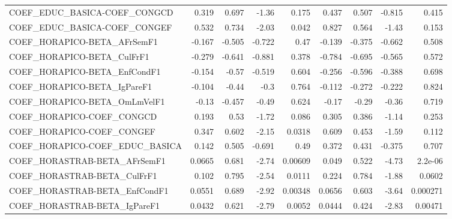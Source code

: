 \begin{tabular}{lrrrrrrrr}
COEF\_EDUC\_BASICA-COEF\_CONGCD          &       0.319 &        0.697 &   -1.36 &    0.175 &      0.437 &       0.507 &       -0.815 &         0.415 \\
COEF\_EDUC\_BASICA-COEF\_CONGEF          &       0.532 &        0.734 &   -2.03 &    0.042 &      0.827 &       0.564 &        -1.43 &         0.153 \\
COEF\_HORAPICO-BETA\_AFrSemF1           &      -0.167 &       -0.505 &  -0.722 &     0.47 &     -0.139 &      -0.375 &       -0.662 &         0.508 \\
COEF\_HORAPICO-BETA\_CulFrF1            &      -0.279 &       -0.641 &  -0.881 &    0.378 &     -0.784 &      -0.695 &       -0.565 &         0.572 \\
COEF\_HORAPICO-BETA\_EnfCondF1          &      -0.154 &        -0.57 &  -0.519 &    0.604 &     -0.256 &      -0.596 &       -0.388 &         0.698 \\
COEF\_HORAPICO-BETA\_IgPareF1           &      -0.104 &        -0.44 &    -0.3 &    0.764 &     -0.112 &      -0.272 &       -0.222 &         0.824 \\
COEF\_HORAPICO-BETA\_OmLmVelF1          &       -0.13 &       -0.457 &   -0.49 &    0.624 &      -0.17 &       -0.29 &        -0.36 &         0.719 \\
COEF\_HORAPICO-COEF\_CONGCD             &       0.193 &         0.53 &   -1.72 &    0.086 &      0.305 &       0.386 &        -1.14 &         0.253 \\
COEF\_HORAPICO-COEF\_CONGEF             &       0.347 &        0.602 &   -2.15 &   0.0318 &      0.609 &       0.453 &        -1.59 &         0.112 \\
COEF\_HORAPICO-COEF\_EDUC\_BASICA        &       0.142 &        0.505 &  -0.691 &     0.49 &      0.372 &       0.431 &       -0.375 &         0.707 \\
COEF\_HORASTRAB-BETA\_AFrSemF1          &      0.0665 &        0.681 &   -2.74 &  0.00609 &      0.049 &       0.522 &        -4.73 &       2.2e-06 \\
COEF\_HORASTRAB-BETA\_CulFrF1           &       0.102 &        0.795 &   -2.54 &   0.0111 &      0.224 &       0.784 &        -1.88 &        0.0602 \\
COEF\_HORASTRAB-BETA\_EnfCondF1         &      0.0551 &        0.689 &   -2.92 &  0.00348 &     0.0656 &       0.603 &        -3.64 &      0.000271 \\
COEF\_HORASTRAB-BETA\_IgPareF1          &      0.0432 &        0.621 &   -2.79 &   0.0052 &     0.0444 &       0.424 &        -2.83 &       0.00471 \\

\end{tabular}

